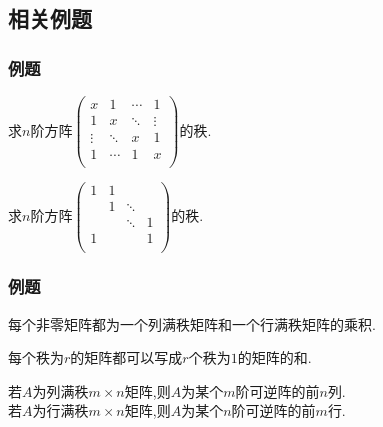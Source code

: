\subsection{相关例题}

\begin{frame}\frametitle{例题}
\begin{example}
求$n$阶方阵$\begin{pmatrix}
x&     1&\cdots& 1\\
1&     x&\ddots&\vdots\\
\vdots&\ddots&     x& 1\\
1&\cdots&     1& x\\
\end{pmatrix}$的秩.
\end{example}
\pp
\begin{example}
求$n$阶方阵$\begin{pmatrix}
1&     1&      &     \\
 &     1&\ddots&     \\
 &      &\ddots&    1\\
1&      &      &    1\\
\end{pmatrix}$的秩.
\end{example}
\end{frame}






\begin{frame}\frametitle{例题}
\begin{example}
每个非零矩阵都为一个列满秩矩阵和一个行满秩矩阵的乘积.
\end{example}
\pp

\begin{example}
每个秩为$r$的矩阵都可以写成$r$个秩为$1$的矩阵的和.
\end{example}
\pp

\begin{example}
若$A$为列满秩$m\times n$矩阵,则$A$为某个$m$阶可逆阵的前$n$列.\\
若$A$为行满秩$m\times n$矩阵,则$A$为某个$n$阶可逆阵的前$m$行.
\end{example}
\end{frame}






